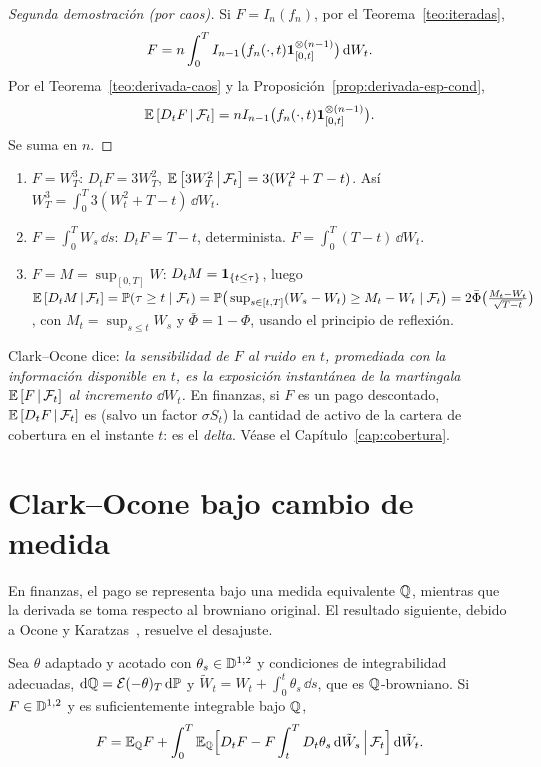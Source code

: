 \begin{proof}[Segunda demostración (por caos)]
Si $F=I_n(f_n)$, por el Teorema~\ref{teo:iteradas},
\[
  F=n\int_0^TI_{n-1}\big(f_n(\cdot,t)\mathbf{1}_{[0,t]}^{\otimes(n-1)}\big)\,\mathrm{d} W_t.
\]
Por el Teorema~\ref{teo:derivada-caos} y la Proposición~\ref{prop:derivada-esp-cond},
\[
  \mathbb{E}\left[D_tF\,\middle|\,\mathcal{F}_t\right]=nI_{n-1}\big(f_n(\cdot,t)\mathbf{1}_{[0,t]}^{\otimes(n-1)}\big).
\]
Se suma en $n$.
\end{proof}

\begin{ejemplo}\label{ej:clark-ocone}
\begin{enumerate}[label=(\alph*)]
  \item $F=W_T^3$: $D_tF=3W_T^2$, $\mathbb{E}\left[3W_T^2\,\middle|\,\mathcal{F}_t\right]=3(W_t^2+T-t)$. Así $W_T^3=
  \int_0^T3(W_t^2+T-t)\,\dd W_t$.
  \item $F=\int_0^TW_s\,\dd s$: $D_tF=T-t$, determinista. $F=\int_0^T(T-t)\,\dd W_t$.
  \item $F=M=\sup_{[0,T]}W$: $D_tM=\mathbf{1}_{\{t\le\tau\}}$, luego $\mathbb{E}\left[D_tM\,\middle|\,\mathcal{F}_t\right]=\mathbb{P}(\tau\ge t\mid\mathcal{F}_t)=
  \mathbb{P}\big(\sup_{s\in[t,T]}(W_s-W_t)\ge M_t-W_t\mid\mathcal{F}_t\big)=2\bar\Phi\big(\frac{M_t-W_t}{\sqrt{T-t}}\big)$, con $M_t=\sup_{s\le t}W_s$ y $\bar\Phi=1-\Phi$,
  usando el principio de reflexión.
\end{enumerate}
\end{ejemplo}

\begin{intuicion}
Clark--Ocone dice: \emph{la sensibilidad de $F$ al ruido en $t$, promediada con la información
disponible en $t$, es la exposición instantánea de la martingala $\mathbb{E}\left[F\,\middle|\,\mathcal{F}_t\right]$ al incremento $\dd W_t$.}
En finanzas, si $F$ es un pago descontado, $\mathbb{E}\left[D_tF\,\middle|\,\mathcal{F}_t\right]$ es (salvo un factor $\sigma S_t$) la cantidad
de activo de la cartera de cobertura en el instante $t$: es el \emph{delta}. Véase el Capítulo~\ref{cap:cobertura}.
\end{intuicion}

\section{Clark--Ocone bajo cambio de medida}
En finanzas, el pago se representa bajo una medida equivalente $\mathbb{Q}$, mientras que la derivada se
toma respecto al browniano original. El resultado siguiente, debido a Ocone y Karatzas~\cite{OconeKaratzas91},
resuelve el desajuste.

\begin{teorema}\label{teo:clark-ocone-generalizado}
Sea $\theta$ adaptado y acotado con $\theta_s\in\mathbb{D}^{1,2}$ y
condiciones de integrabilidad adecuadas, $\mathrm{d}\mathbb{Q}=\mathcal E(-\theta)_T\,\mathrm{d}\mathbb{P}$ y $\tilde W_t=W_t+\int_0^t\theta_s\,\dd s$, que es
$\mathbb{Q}$-browniano. Si $F\in\mathbb{D}^{1,2}$ y es suficientemente integrable bajo $\mathbb{Q}$,
\[
  F=\mathbb{E}_{\mathbb{Q}} F+\int_0^T\mathbb{E}_{\mathbb{Q}}\Big[D_tF-F\int_t^TD_t\theta_s\,\mathrm{d}\tilde W_s\,\Big|\,\mathcal{F}_t\Big]\,\mathrm{d}\tilde W_t.
\]
\end{teorema}

